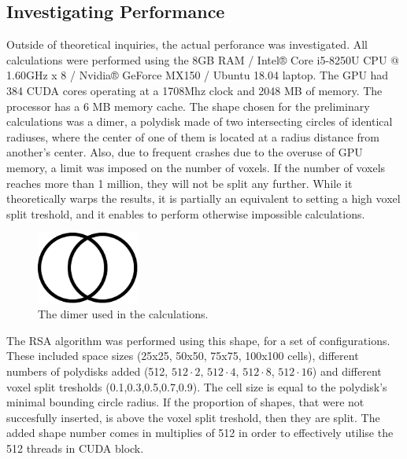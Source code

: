 \documentclass[12pt, oneside]{report}
\begin{document}
\subsection{Investigating Performance}

Outside of theoretical inquiries, the actual perforance was investigated. All calculations were performed using the 8GB RAM / Intel® Core i5-8250U CPU @ 1.60GHz x 8 / Nvidia® GeForce MX150 / Ubuntu 18.04 laptop. The GPU had 384 CUDA cores operating at a 1708Mhz clock and 2048 MB of memory. The processor has a 6 MB memory cache. \newline
The shape chosen for the preliminary calculations was a dimer, a polydisk made of two intersecting circles of identical radiuses, where the center of one of them is located at a radius distance from another's center. Also, due to frequent crashes due to the overuse of GPU memory, a limit was imposed on the number of voxels. If the number of voxels reaches more than 1 million, they will not be split any further. While it theoretically warps the results, it is partially an equivalent to setting a high voxel split treshold, and it enables to perform otherwise impossible calculations.

\begin{figure}[H]
  \centering
	\includegraphics[width=0.3\textwidth,keepaspectratio]{Images/SummaryOptimisation/dimer.pdf}
	\caption{The dimer used in the calculations.}
	\label{summary_dimer}
\end{figure}
The RSA algorithm was performed using this shape, for a set of configurations. These included space sizes (25x25, 50x50, 75x75, 100x100 cells), different numbers of polydisks added (512, $512 \cdot 2$, $512 \cdot 4$, $512 \cdot 8$, $512 \cdot 16$) and different voxel split tresholds (0.1,0.3,0.5,0.7,0.9). The cell size is equal to the polydisk's minimal bounding circle radius.
If the proportion of shapes, that were not succesfully inserted, is above the voxel split treshold, then they are split. The added shape number comes in multiplies of 512 in order to effectively utilise the 512 threads in CUDA block.
\end{document}
